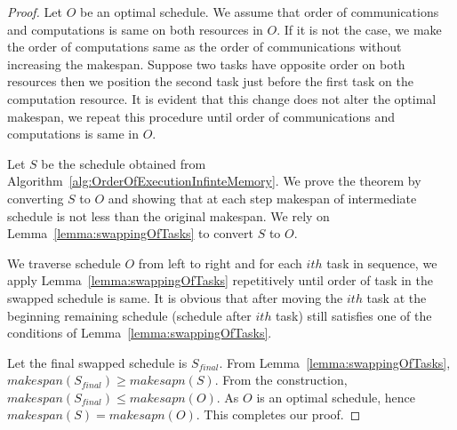 \documentclass[runningheads]{llncs} %
\begin{document}
	\begin{proof}
	
	Let $O$ be an optimal schedule. We assume that order of communications and computations is same on both resources in $O$. If it is not the case, we make the order of computations same as the order of communications without increasing the makespan.  Suppose two tasks have opposite order on both resources then we position the second task just before the first task on the computation resource. It is evident that this change does not alter the optimal  makespan, we repeat this procedure until order of communications and computations is same in $O$.
	
	Let $S$ be the  schedule obtained from Algorithm~\ref{alg:OrderOfExecutionInfinteMemory}. We prove the theorem by converting $S$ to $O$ and showing that at each step makespan of intermediate schedule is not less than the original makespan. We rely on Lemma~\ref{lemma:swappingOfTasks} to convert $S$ to $O$.

  We traverse schedule $O$ from left to right and for each $ith$ task in sequence, we apply Lemma~\ref{lemma:swappingOfTasks} repetitively until order of task in the swapped schedule is same. It is obvious that after moving the $ith$ task at the beginning remaining schedule (schedule after $ith$ task) still satisfies one of the conditions of Lemma~\ref{lemma:swappingOfTasks}.
  
  Let the final swapped schedule is $S_{final}$. From Lemma~\ref{lemma:swappingOfTasks}, $makespan(S_{final}) \ge makesapn(S)$. From the construction, $makespan(S_{final}) \le makesapn(O)$. As $O$ is an optimal schedule, hence $makespan(S) = makesapn(O)$. This completes our proof.
	
	
	\end{proof}

	
\end{document}
